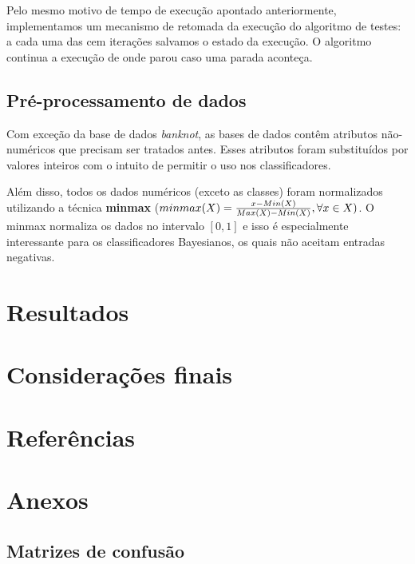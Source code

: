 \documentclass[11pt]{article}
\begin{document}
Pelo mesmo motivo de tempo de execução apontado anteriormente, implementamos um
mecanismo de retomada da execução do algoritmo de testes: a cada uma das cem
iterações salvamos o estado da execução. O algoritmo continua a execução de
onde parou caso uma parada aconteça.

\subsection{Pré-processamento de dados}

Com exceção da base de dados \textit{banknot}, as bases de dados contêm
atributos não-numéricos que precisam ser tratados antes. Esses atributos foram
substituídos por valores inteiros com o intuito de permitir o uso nos
classificadores.

Além disso, todos os dados numéricos (exceto as classes) foram normalizados
utilizando a técnica \textbf{minmax} ($minmax(X) = {x-Min(X)\over{Max(X)-Min(X)}}, \forall x \in X)$. 
O minmax normaliza os dados no intervalo $[0,1]$ e isso é especialmente
interessante para os classificadores Bayesianos, os quais não aceitam entradas
negativas.

\section{Resultados}
\section{Considerações finais}
\section{Referências}
\section{Anexos}
\subsection{Matrizes de confusão}
\end{document}
